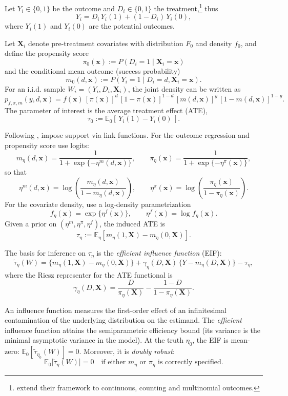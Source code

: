 Let $Y_i\in\{0,1\}$ be the outcome and $D_i\in\{0,1\}$ the treatment,\footnote{\cite{breunig2025double} extend their framework to continuous, counting and multinomial outcomes.} thus
\[
Y_i = D_i\,Y_i(1) + (1-D_i)\,Y_i(0),
\]
where $Y_i(1)$ and $Y_i(0)$ are the potential outcomes.

Let $\mathbf{X}_i$ denote pre-treatment covariates with distribution $F_0$ and density $f_0$, and define the propensity score
\[
\pi_0(\mathbf{x}) := P(D_i=1\mid \mathbf{X}_i=\mathbf{x})
\]
and the conditional mean outcome (success probability)
\[
m_0(d,\mathbf{x}) := P(Y_i=1\mid D_i=d,\mathbf{X}_i=\mathbf{x}).
\]
For an i.i.d. sample $W_i=(Y_i,D_i,\mathbf{X}_i)$, the joint density can be written as
\[
p_{f,\pi,m}(y,d,\mathbf{x})
= f(\mathbf{x})\,[\pi(\mathbf{x})]^d\,[1-\pi(\mathbf{x})]^{1-d}\,[m(d,\mathbf{x})]^y\,[1-m(d,\mathbf{x})]^{1-y}.
\]
The parameter of interest is the average treatment effect (ATE),
\[
\tau_0 := \mathbb{E}_0\!\left[\,Y_i(1)-Y_i(0)\,\right].
\]

Following \cite{breunig2025double}, impose support via link functions. For the outcome regression and propensity score use logits:
\[
m_\eta(d,\mathbf{x})=\frac{1}{1+\exp\{-\eta^m(d,\mathbf{x})\}},
\qquad
\pi_\eta(\mathbf{x})=\frac{1}{1+\exp\{-\eta^\pi(\mathbf{x})\}},
\]
so that
\[
\eta^m(d,\mathbf{x})=\log\!\left(\frac{m_\eta(d,\mathbf{x})}{1-m_\eta(d,\mathbf{x})}\right),
\qquad
\eta^\pi(\mathbf{x})=\log\!\left(\frac{\pi_\eta(\mathbf{x})}{1-\pi_\eta(\mathbf{x})}\right).
\]
For the covariate density, use a log-density parametrization
\[
f_\eta(\mathbf{x})=\exp\{\eta^f(\mathbf{x})\},
\qquad
\eta^f(\mathbf{x})=\log f_\eta(\mathbf{x}).
\]
Given a prior on $(\eta^m,\eta^\pi,\eta^f)$, the induced ATE is
\[
\tau_\eta := \mathbb{E}_\eta\!\left[m_\eta(1,\mathbf{X})-m_\eta(0,\mathbf{X})\right].
\]

The basis for inference on $\tau_\eta$ is the \textit{efficient influence function} (EIF):
\[
\tilde{\tau}_\eta(W)
= \big\{m_\eta(1,\mathbf{X})-m_\eta(0,\mathbf{X})\big\}
+ \gamma_\eta(D,\mathbf{X})\,\big\{Y-m_\eta(D,\mathbf{X})\big\}
- \tau_\eta,
\]
where the Riesz representer for the ATE functional is
\[
\gamma_\eta(D,\mathbf{X})
= \frac{D}{\pi_\eta(\mathbf{X})}
- \frac{1-D}{1-\pi_\eta(\mathbf{X})}.
\]

An influence function measures the first-order effect of an infinitesimal contamination of the underlying distribution on the estimand. The \emph{efficient} influence function attains the semiparametric efficiency bound (its variance is the minimal asymptotic variance in the model). At the truth $\eta_0$, the EIF is mean-zero: $\mathbb{E}_0[\tilde{\tau}_{\eta_0}(W)]=0$. Moreover, it is \emph{doubly robust}:
\[
\mathbb{E}_0\!\big[\tilde{\tau}_\eta(W)\big]=0
\quad\text{if either } m_\eta \text{ or } \pi_\eta \text{ is correctly specified.}
\]

